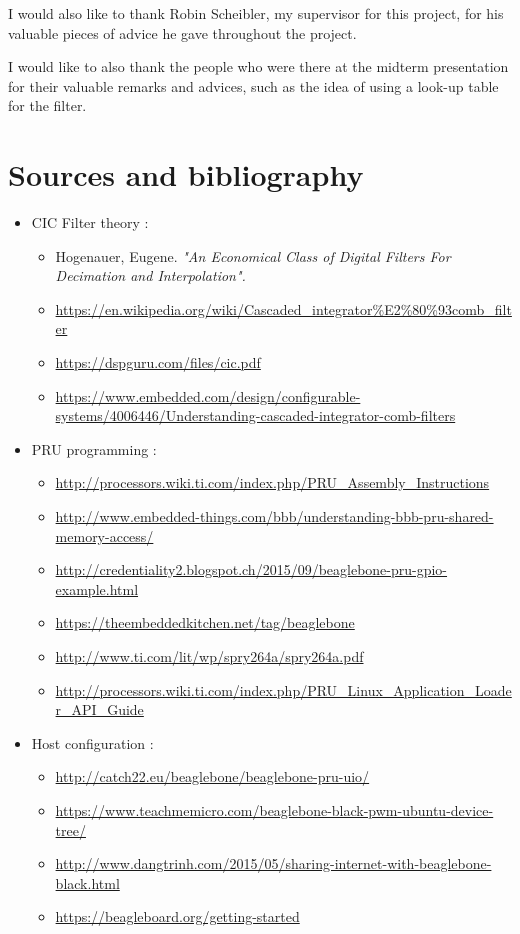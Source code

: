 \documentclass[]{report}
\providecommand{\tightlist}{%
	\setlength{\itemsep}{0pt}\setlength{\parskip}{0pt}}
\begin{document}
I would also like to thank Robin Scheibler, my supervisor for this project, for his valuable pieces of advice he gave throughout the project.

I would like to also thank the people who were there at the midterm presentation for their valuable remarks and advices, such as the idea of using a look-up table for the filter.

\hypertarget{sources-and-bibliography}{%
\chapter*{Sources and bibliography}\label{sources-and-bibliography}}

\begin{itemize}
\tightlist
\item
  CIC Filter theory :
  
  

  \begin{itemize}
  \tightlist
  \item
    Hogenauer, Eugene. \emph{"An Economical Class of Digital Filters
    For Decimation and Interpolation".}
  \item
    \url{https://en.wikipedia.org/wiki/Cascaded_integrator%E2%80%93comb_filter}
  \item
    \url{https://dspguru.com/files/cic.pdf}
  \item
    \url{https://www.embedded.com/design/configurable-systems/4006446/Understanding-cascaded-integrator-comb-filters}
  \end{itemize}
\item
  PRU programming :

  \begin{itemize}
  \tightlist
  \item
    \url{http://processors.wiki.ti.com/index.php/PRU\_Assembly\_Instructions}
  \item
    \url{http://www.embedded-things.com/bbb/understanding-bbb-pru-shared-memory-access/}
  \item
    \url{http://credentiality2.blogspot.ch/2015/09/beaglebone-pru-gpio-example.html}
  \item
    \url{https://theembeddedkitchen.net/tag/beaglebone}
  \item
    \url{http://www.ti.com/lit/wp/spry264a/spry264a.pdf}
  \item
    \url{http://processors.wiki.ti.com/index.php/PRU_Linux_Application_Loader_API_Guide}
  \end{itemize}
\item
  Host configuration :

  \begin{itemize}
  \tightlist
  \item
    \url{http://catch22.eu/beaglebone/beaglebone-pru-uio/}
  \item
    \url{https://www.teachmemicro.com/beaglebone-black-pwm-ubuntu-device-tree/}
  \item
    \url{http://www.dangtrinh.com/2015/05/sharing-internet-with-beaglebone-black.html}
  \item
    \url{https://beagleboard.org/getting-started}
  \end{itemize}
\end{itemize}
\end{document}
